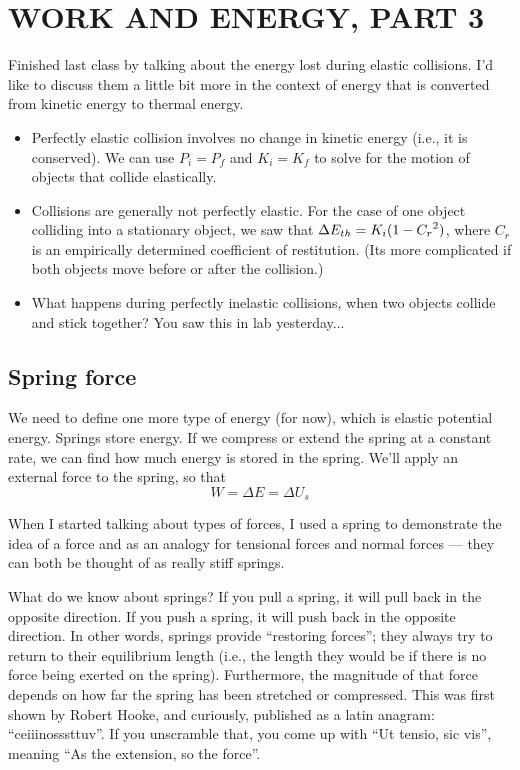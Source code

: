 \section{WORK AND ENERGY, PART 3}
Finished last class by talking about the energy lost during elastic collisions. I'd like to discuss them a little bit more in the context of energy that is converted from kinetic energy to thermal energy.
\begin{itemize}
\item Perfectly elastic collision involves no change in kinetic energy (i.e., it is conserved). We can use $P_i=P_f$ and $K_i=K_f$ to solve for the motion of objects that collide elastically.
\item Collisions are generally not perfectly elastic. For the case of one object colliding into a stationary object, we saw that $\Delta{E_{th}}=K_i(1-C_r\displaystyle^2)$, where $C_r$ is an empirically determined coefficient of restitution. (Its more complicated if both objects move before or after the collision.)
\item What happens during perfectly inelastic collisions, when two objects collide and stick together? You saw this in lab yesterday...
\end{itemize}

\subsection*{Spring force}
We need to define one more type of energy (for now), which is elastic potential energy. Springs store energy. If we compress or extend the spring at a constant rate, we can find how much energy is stored in the spring. We'll apply an external force to the spring, so that
$$W=\Delta{E}=\Delta{U_s}$$

When I started talking about types of forces, I used a spring to demonstrate the idea of a force and as an analogy for tensional forces and normal forces --- they can both be thought of as really stiff springs.

What do we know about springs? If you pull a spring, it will pull back in the opposite direction. If you push a spring, it will push back in the opposite direction. In other words, springs provide ``restoring forces''; they always try to return to their equilibrium length (i.e., the length they would be if there is no force being exerted on the spring). Furthermore, the magnitude of that force depends on how far the spring has been stretched or compressed. This was first shown by Robert Hooke, and curiously, published as a latin anagram: ``ceiiinosssttuv''. If you unscramble that, you come up with ``Ut tensio, sic vis'', meaning ``As the extension, so the force''.

